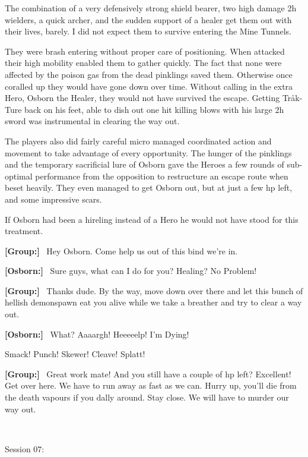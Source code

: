 \begin{readoutloud}
The combination of a very defensively strong shield bearer, two high damage 2h wielders, a quick archer, and the sudden support of a healer get them out with their lives, barely. I did not expect them to survive entering the Mine Tunnels.

They were brash entering without proper care of positioning. When attacked their high mobility enabled them to gather quickly. The fact that none were affected by the poison gas from the dead pinklings saved them. Otherwise once coralled up they would have gone down over time. Without calling in the extra Hero, Osborn the Healer, they would not have survived the escape. Getting Tråk-Ture back on his feet, able to dish out one hit killing blows with his large 2h sword was instrumental in clearing the way out.

The players also did fairly careful micro managed coordinated action and movement to take advantage of every opportunity. The hunger of the pinklings and the temporary sacrificial lure of Osborn gave the Heroes a few rounds of sub-optimal performance from the opposition to restructure an escape route when beset heavily. They even managed to get Osborn out, but at just a few hp left, and some impressive scars.

If Osborn had been a hireling instead of a Hero he would not have stood for this treatment.

\vsmall\textbf{[Group:]}\normalsize ~ Hey Osborn. Come help us out of this bind we're in.

\vsmall\textbf{[Osborn:]}\normalsize ~ Sure guys, what can I do for you? Healing? No Problem!

\vsmall\textbf{[Group:]}\normalsize ~ Thanks dude. By the way, move down over there and let this bunch of hellish demonspawn eat you alive while we take a breather and try to clear a way out.

\vsmall\textbf{[Osborn:]}\normalsize ~ What? Aaaargh! Heeeeelp! I'm Dying!

Smack! Punch! Skewer! Cleave! Splatt!

\vsmall\textbf{[Group:]}\normalsize ~ Great work mate! And you still have a couple of hp left? Excellent! Get over here. We have to run away as fast as we can. Hurry up, you'll die from the death vapours if you dally around. Stay close. We will have to murder our way out.
\end{readoutloud}

\


\forceindent Session 07:\\                                              %

